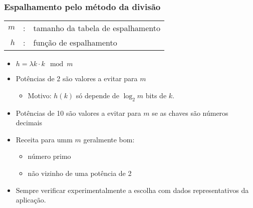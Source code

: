 \documentclass{beamer}
\begin{document}
\begin{frame}

  \frametitle{Espalhamento pelo método da divisão}

  \begin{tabular}{rcl}
    $m$ & : & tamanho da tabela de espalhamento \\
    $h$ & : & função de espalhamento \\
  \end{tabular}
  
  \begin{itemize}
    \item $h = \lambda k \cdot k \mod m$

    \item Potências de 2 são valores a evitar para $m$

      \begin{itemize}

        \item Motivo: $h(k)$ só depende de $\log_2 m$ bits de $k$.

      \end{itemize}

    \item Potências de 10 são valores a evitar para $m$ se as chaves são números decimais

    \item Receita para umm $m$ geralmente bom:

      \begin{itemize}

        \item número primo

        \item não vizinho de uma potência de 2

      \end{itemize}

    \item Sempre verificar experimentalmente a escolha com dados representativos da aplicação.
      
\end{itemize}

\end{frame}
\end{document}
